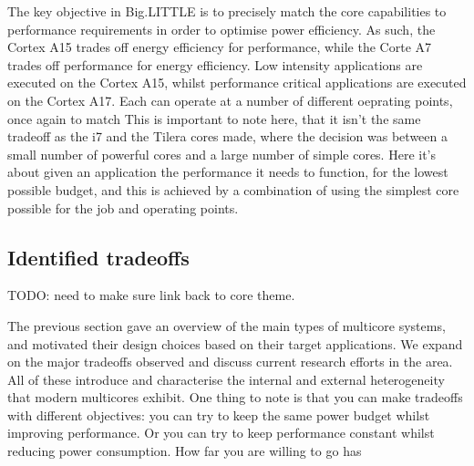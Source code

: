 The key objective in Big.LITTLE is to precisely match the core capabilities to 
performance requirements in order to optimise power efficiency. As such, the Cortex A15 trades off energy
efficiency for performance, while the Corte A7 trades off performance for energy efficiency.
Low intensity applications are executed on the Cortex A15, whilst performance critical applications
are executed on the Cortex A17.  Each can operate at a number of different oeprating points,
once again to match 
This is important to note here, that it isn't the same tradeoff
as the i7 and the Tilera cores made, where the decision was between
a small number of powerful cores and a large number of simple cores. 
Here it's about given an application the performance it needs to function,
for the lowest possible budget, and this is achieved by a combination of 
using the simplest core possible for the job and operating points. 

\subsection{Identified tradeoffs}
TODO: need to make sure link back to core theme. 

The previous section gave an overview of the main types of multicore systems, 
and motivated their design choices based on their target applications. 
We expand on the major tradeoffs observed and discuss current research efforts in the area. 
All of these introduce and characterise the internal and external heterogeneity that 
modern multicores exhibit. 
One thing to note is that you can make tradeoffs with different objectives:
you can try to keep the same power budget whilst improving performance. Or
you can try to keep performance constant whilst reducing power consumption. 
How far you are willing to go has

